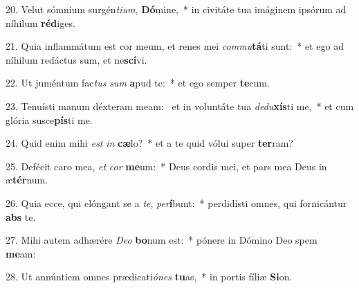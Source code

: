 20. Velut sómnium surgén\textit{ti}\textit{um}, \textbf{Dó}mine,~*  in civitáte tua imáginem ipsórum ad níhilum \textbf{réd}iges.\

21. Quia inflammátum est cor meum, et renes mei \textit{com}\textit{mu}\textbf{tá}ti sunt:~*  et ego ad níhilum redáctus sum, et ne\textbf{scí}vi.\

22. Ut juméntum fac\textit{tus} \textit{sum} \textbf{a}pud te:~*  et ego semper \textbf{te}cum.\

23. Tenuísti manum déxteram meam: \dag\  et in voluntáte tua \textit{de}\textit{du}\textbf{xís}ti me,~*  et cum glória susce\textbf{pís}ti me.\

24. Quid enim mihi \textit{est} \textit{in} \textbf{cæ}lo?~*  et a te quid vólui super \textbf{ter}ram?\

25. Defécit caro mea, \textit{et} \textit{cor} \textbf{me}um:~*  Deus cordis mei, et pars mea Deus in æ\textbf{tér}num.\

26. Quia ecce, qui elóngant se a \textit{te}, \textit{per}\textbf{í}bunt:~*  perdidísti omnes, qui fornicántur \textbf{abs} te.\

27. Mihi autem adhærére \textit{De}\textit{o} \textbf{bo}num est:~*  pónere in Dómino Deo spem \textbf{me}am:\

28. Ut annúntiem omnes prædicati\textit{ó}\textit{nes} \textbf{tu}as,~*  in portis fíliæ \textbf{Si}on.\

